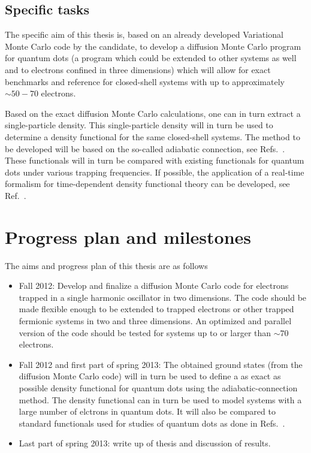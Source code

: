\documentclass[twocolumn]{revtex4}
\begin{document}
\subsection*{Specific tasks}
The specific aim of this thesis is, based on an already developed Variational Monte Carlo code by the candidate,
 to develop a diffusion Monte Carlo program for quantum dots (a program which could be extended to other systems as well and to electrons confined in three dimensions) which will allow for exact benchmarks and reference for
closed-shell systems with up to approximately $\sim 50-70$ electrons. 

Based on the exact diffusion Monte Carlo calculations, one can in turn extract a single-particle density.
This single-particle density will in turn be used to determine a density functional for the same closed-shell systems. The method to be developed will be based on the so-called adiabatic connection, see Refs.~\cite{ref1,ref2,ref3}.
These functionals will in turn be compared with existing functionals for quantum dots under various 
trapping frequencies.
If possible, the application of a real-time formalism  for time-dependent density functional theory can be developed, see Ref.~\cite{yabana}.
\section*{Progress plan and milestones}
The aims and progress plan of this thesis are as follows
\begin{itemize}
\item Fall 2012: Develop and finalize a diffusion Monte Carlo  code for electrons trapped in a single harmonic oscillator  
in two dimensions.  The code should be made flexible enough to be extended to trapped electrons or other trapped
fermionic systems in two and three dimensions. An optimized and parallel version of the code should be tested
for systems up to or larger than $\sim 70$ electrons. 
 \item Fall 2012 and first part of  spring 2013: The obtained ground states (from the diffusion Monte Carlo code) will in turn be used to define a as exact as possible 
density functional for quantum dots
using the adiabatic-connection method. The density functional can in turn be used to model
systems with a large number of elctrons in quantum dots. It will also be compared to standard functionals used for studies of quantum dots as done in Refs.~\cite{finns1,finns2}.
\item Last part of spring 2013: write up of thesis and discussion of results.
\end{itemize}
\end{document}

